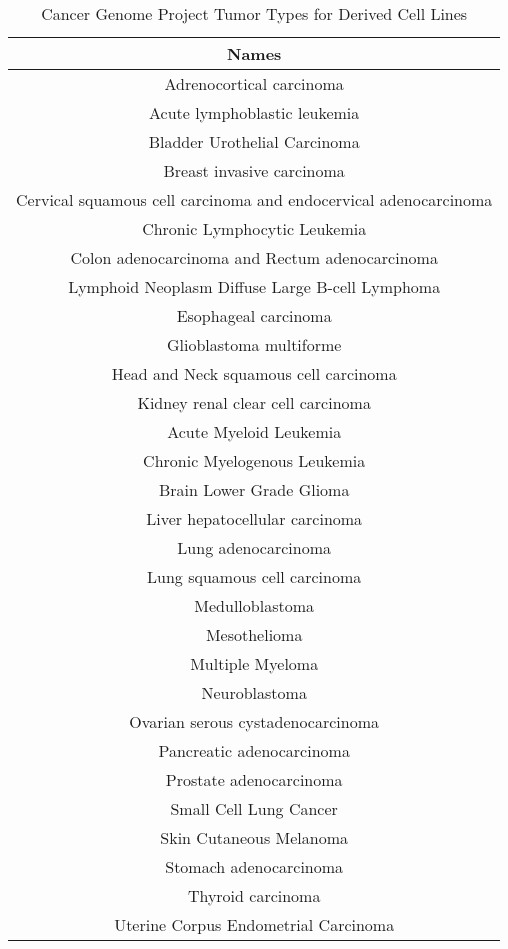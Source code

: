 \begin{table}
\begin{center}
\begin{tabular}{|c|} \hline
\textbf{Names} \\ \hline
Adrenocortical carcinoma\\
Acute lymphoblastic leukemia\\
Bladder Urothelial Carcinoma\\
Breast invasive carcinoma\\
Cervical squamous cell carcinoma and endocervical adenocarcinoma\\
Chronic Lymphocytic Leukemia\\
Colon adenocarcinoma and Rectum adenocarcinoma\\
Lymphoid Neoplasm Diffuse Large B-cell Lymphoma\\
Esophageal carcinoma\\
Glioblastoma multiforme\\
Head and Neck squamous cell carcinoma\\
Kidney renal clear cell carcinoma\\
Acute Myeloid Leukemia\\
Chronic Myelogenous Leukemia\\
Brain Lower Grade Glioma\\
Liver hepatocellular carcinoma\\
Lung adenocarcinoma\\
Lung squamous cell carcinoma\\
Medulloblastoma\\
Mesothelioma\\
Multiple Myeloma\\
Neuroblastoma\\
Ovarian serous cystadenocarcinoma\\
Pancreatic adenocarcinoma\\
Prostate adenocarcinoma\\
Small Cell Lung Cancer\\
Skin Cutaneous Melanoma\\
Stomach adenocarcinoma\\
Thyroid carcinoma\\
Uterine Corpus Endometrial Carcinoma\\ \hline
\end{tabular}
\end{center}
\caption{Cancer Genome Project Tumor Types for Derived Cell Lines} \label{cgp_types}
\end{table}

